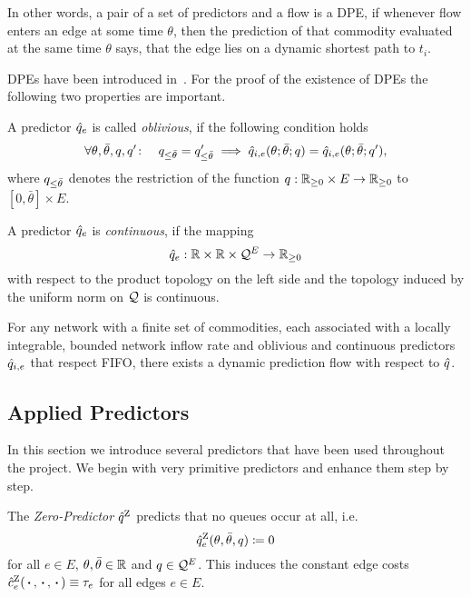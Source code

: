 In other words, a pair of a set of predictors and a flow is a DPE, if whenever flow enters an edge at some time $\theta$, then the prediction of that commodity evaluated at the same time $\theta$ says, that the edge lies on a dynamic shortest path to $t_i$.

DPEs have been introduced in~\cite{mainpaper}.
For the proof of the existence of DPEs the following two properties are important.

\begin{definition}
    A predictor $\hat q_{e}$  is called \emph{oblivious},
if the following condition holds
    \[
    \forall \theta,\bar\theta, q,q'\colon\quad
    q_{\leq \bar\theta} = q'_{\leq \bar\theta}
    \implies
    \hat q_{i,e}(\theta;\bar\theta;q)=\hat q_{i,e}(\theta;\bar\theta;q'),
    \]
    where $q_{\leq \bar\theta}$ denotes the restriction of the function $q: \mathbb{R}_{\geq 0} \times E \to \mathbb{R}_{\geq 0}$ to $[0,\bar\theta] \times E$.
\end{definition}
\begin{definition}
    A predictor $\hat q_{e}$ is \emph{continuous}, if the mapping 
    \[
        \hat q_{e}: \mathbb{R}\times \mathbb{R}\times \mathcal{Q}^E \rightarrow \mathbb{R}_{\geq0}
    \] with respect to the product topology on the left side and the topology induced by the uniform norm on $\mathcal{Q}$ is continuous.
\end{definition}

\begin{theorem}\label{thm:dpe-existence}
    For any network with a finite set of commodities, each associated with a locally integrable, bounded network inflow rate and oblivious and continuous predictors $\hat q_{i,e}$ that respect FIFO, there exists a dynamic prediction flow with respect to $\hat q$. 
\end{theorem}

\subsection{Applied Predictors}\label{sec:applied-predictors}

In this section we introduce several predictors that have been used throughout the project.
We begin with very primitive predictors and enhance them step by step.


The \emph{Zero-Predictor} $\hat q^{\text{Z}}$ predicts that no queues occur at all, i.e.\[
    \hat q^{\text{Z}}_{e}(\theta, \bar\theta, q) \coloneqq 0
\]
for all $e\in E$, $\theta,\bar\theta\in\mathbb{R}$ and $q\in \mathcal{Q}^E$.
This induces the constant edge costs $\hat c^{\text{Z}}_e(\,\boldsymbol{\cdot}\,, \,\boldsymbol{\cdot}\,, \,\boldsymbol{\cdot}\,)\equiv \tau_e$ for all edges $e\in E$.

